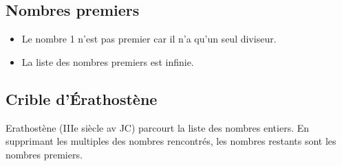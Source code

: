 \documentclass[a4paper,dvipsnames]{article}
\begin{document}
\subsection{Nombres premiers}


\begin{Rqs}
\begin{itemize}
\item Le nombre 1 n'est pas premier car il n'a qu'un seul diviseur.
\item La liste des nombres premiers est infinie.
\end{itemize}
\end{Rqs}

\subsection{Crible d'Érathostène}

\begin{His}
Erathostène (IIIe siècle av JC) parcourt la liste des nombres entiers. En supprimant les multiples des nombres rencontrés, les nombres restants sont les nombres premiers.
\end{His}
\end{document}
